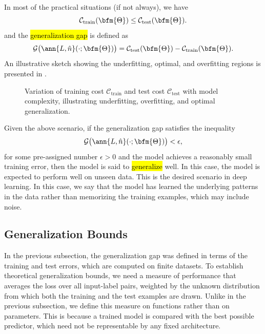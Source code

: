 In most of the practical situations (if not always), we have
$$
\mathcal{C}_\text{train}(\bfm{\Theta}) \le \mathcal{C}_\text{test}(\bfm{\Theta}).
$$
and the \hl{generalization gap} is defined as
\begin{equation}
\mathcal{G}\big(\ann{L,\hat{n}}(\cdot;\bfm{\Theta}) \big) = \mathcal{C}_{\text{test}}(\bfm{\Theta}) - \mathcal{C}_{\text{train}}(\bfm{\Theta}).\label{generalization.gap.eq}
\end{equation}
An illustrative sketch showing the underfitting, optimal, and overfitting regions is presented in .
\begin{figure}[t]
\centering

\caption{Variation of training cost $\mathcal{C}_{\text{train}}$ and test cost $\mathcal{C}_{\text{test}}$
with model complexity, illustrating underfitting, overfitting, and optimal generalization.}
\label{train-test-cost.fig}
\end{figure}
Given the above scenario, if the generalization gap satisfies the inequality
$$\mathcal{G}\big(\ann{L,\hat{n}}(\cdot;\bfm{\Theta}) \big) < \epsilon,$$
for some pre-assigned number $\epsilon>0$ and the model achieves a reasonably small training error,  then the model is said to \hl{generalize} well.
In this case, the model is expected to perform well on unseen data. This is the desired scenario in deep learning. In this case, we say that the model has learned the underlying patterns in the data rather than memorizing the training examples, which may include noise.

\subsection{Generalization Bounds}\label{generalization.bounds.subs}
In the previous subsection, the generalization gap was defined in terms of the training and test errors, which are computed on finite datasets. To establish theoretical generalization bounds, we need a measure of performance that averages the loss over all input-label pairs, weighted by the unknown distribution from which both the training and the test examples are drawn. Unlike in the previous subsection, we define this measure on functions rather than on parameters. This is because a trained model is compared with the best possible predictor, which need not be representable by any fixed architecture.

